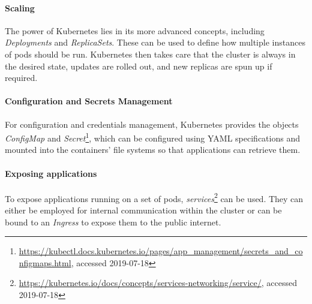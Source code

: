 \paragraph{Scaling}

The power of Kubernetes lies in its more advanced concepts, including \textit{Deployments} and \textit{ReplicaSets}. These can be used to define how multiple instances of pods should be run. Kubernetes then takes care that the cluster is always in the desired state, updates are rolled out, and new replicas are spun up if required.

\paragraph{Configuration and Secrets Management}

For configuration and credentials management, Kubernetes provides the objects \textit{ConfigMap} and \textit{Secret}\footnote{\url{https://kubectl.docs.kubernetes.io/pages/app_management/secrets_and_configmaps.html}, accessed 2019-07-18}, which can be configured using YAML specifications and mounted into the containers' file systems so that applications can retrieve them.

\paragraph{Exposing applications}

To expose applications running on a set of pods, \textit{services}\footnote{\url{https://kubernetes.io/docs/concepts/services-networking/service/}, accessed 2019-07-18} can be used. They can either be employed for internal communication within the cluster or can be bound to an \textit{Ingress} to expose them to the public internet. 

